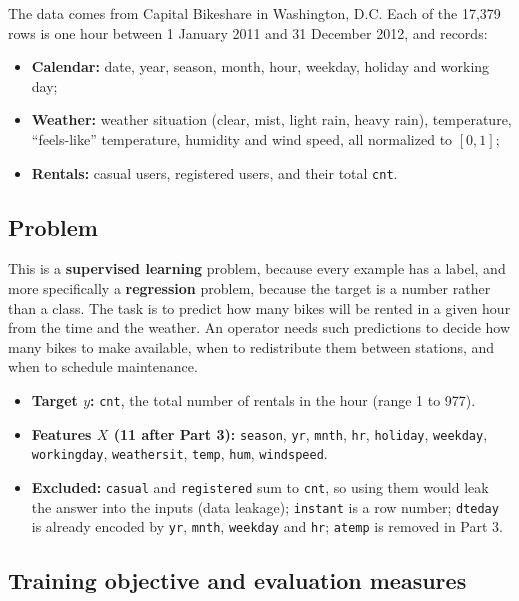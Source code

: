 \documentclass[11pt]{article}
\newcommand{\code}[1]{\texttt{#1}}
\begin{document}
The data comes from Capital Bikeshare in Washington, D.C. Each of the 17,379 rows is one hour
between 1 January 2011 and 31 December 2012, and records:
\begin{itemize}
  \item \textbf{Calendar:} date, year, season, month, hour, weekday, holiday and working day;
  \item \textbf{Weather:} weather situation (clear, mist, light rain, heavy rain), temperature, ``feels-like''
        temperature, humidity and wind speed, all normalized to $[0,1]$;
  \item \textbf{Rentals:} casual users, registered users, and their total \code{cnt}.
\end{itemize}

\subsection{Problem}

This is a \textbf{supervised learning} problem, because every example has a label, and more
specifically a \textbf{regression} problem, because the target is a number rather than a class.
The task is to predict how many bikes will be rented in a given hour from the time and the weather.
An operator needs such predictions to decide how many bikes to make available, when to redistribute
them between stations, and when to schedule maintenance.

\begin{itemize}
  \item \textbf{Target $y$:} \code{cnt}, the total number of rentals in the hour (range 1 to 977).
  \item \textbf{Features $X$ (11 after Part 3):} \code{season}, \code{yr}, \code{mnth}, \code{hr},
        \code{holiday}, \code{weekday}, \code{workingday}, \code{weathersit}, \code{temp}, \code{hum}, \code{windspeed}.
  \item \textbf{Excluded:} \code{casual} and \code{registered} sum to \code{cnt}, so using them would leak
        the answer into the inputs (data leakage); \code{instant} is a row number; \code{dteday} is already
        encoded by \code{yr}, \code{mnth}, \code{weekday} and \code{hr}; \code{atemp} is removed in Part 3.
\end{itemize}

\subsection{Training objective and evaluation measures}
\end{document}
